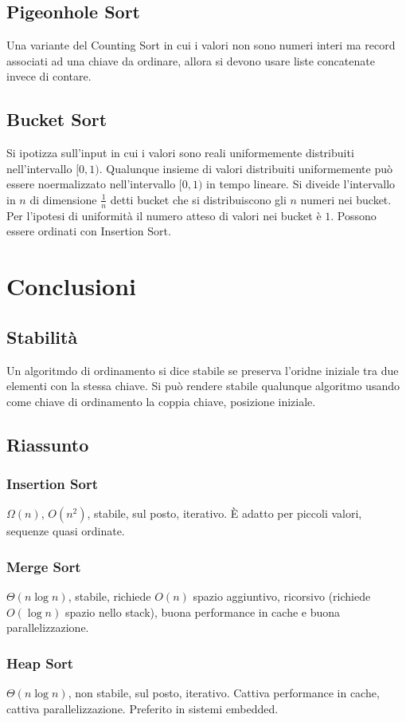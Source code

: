 \subsection{Pigeonhole Sort}
Una variante del Counting Sort in cui i valori non sono numeri interi ma record associati ad una chiave da ordinare, allora si devono usare liste concatenate invece di contare. 
\subsection{Bucket Sort}
Si ipotizza sull'input in cui i valori sono reali uniformemente distribuiti nell'intervallo $[0, 1)$. Qualunque insieme di valori distribuiti uniformemente pu\`o essere noermalizzato
nell'intervallo $[0, 1)$ in tempo lineare. Si diveide l'intervallo in $n$  di dimensione $\frac{1}{n}$ detti bucket che si distribuiscono gli $n$ numeri nei bucket. Per l'ipotesi di 
uniformit\`a il numero atteso di valori nei bucket \`e $1$. Possono essere ordinati con Insertion Sort. 
\section{Conclusioni}
\subsection{Stabilit\`a}
Un algoritmdo di ordinamento si dice stabile se preserva l'oridne iniziale tra due elementi con la stessa chiave. Si pu\`o rendere stabile qualunque algoritmo usando come chiave di 
ordinamento la coppia chiave, posizione iniziale. 
\subsection{Riassunto}
\subsubsection{Insertion Sort}
$\Omega(n)$, $O(n^2)$, stabile, sul posto, iterativo. \`E adatto per piccoli valori, sequenze quasi ordinate. 
\subsubsection{Merge Sort}
$\Theta(n\log n)$, stabile, richiede $O(n)$ spazio aggiuntivo, ricorsivo (richiede $O(\log n)$ spazio nello stack), buona performance in cache e buona parallelizzazione. 
\subsubsection{Heap Sort}
$\Theta(n\log n)$, non stabile, sul posto, iterativo. Cattiva performance in cache, cattiva parallelizzazione. Preferito in sistemi embedded. 
